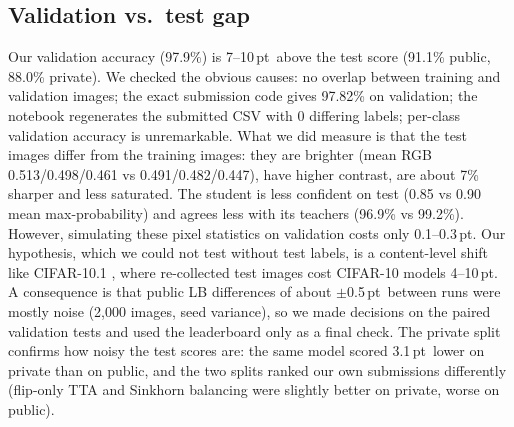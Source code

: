\documentclass[10pt]{article}
\newcommand{\pt}{\,pt}
\begin{document}
\subsection{Validation vs.\ test gap}\label{sec:gap}
Our validation accuracy (97.9\%) is 7--10\pt\ above the test score (91.1\% public, 88.0\% private). We checked the obvious causes:
no overlap between training and validation images; the exact submission code gives 97.82\% on validation;
the notebook regenerates the submitted CSV with 0 differing labels; per-class validation accuracy is unremarkable.
What we did measure is that the test images differ from the training images: they are brighter
(mean RGB 0.513/0.498/0.461 vs 0.491/0.482/0.447), have higher contrast, are about 7\% sharper and less saturated.
The student is less confident on test (0.85 vs 0.90 mean max-probability) and agrees less with its teachers (96.9\% vs 99.2\%).
However, simulating these pixel statistics on validation costs only 0.1--0.3\pt. Our hypothesis, which we could not test without
test labels, is a content-level shift like CIFAR-10.1 \cite{recht2018cifar}, where re-collected test images cost CIFAR-10 models
4--10\pt. A consequence is that public LB differences of about $\pm$0.5\pt\ between runs were mostly noise (2,000 images,
seed variance), so we made decisions on the paired validation tests and used the leaderboard only as a final check.
The private split confirms how noisy the test scores are: the same model scored 3.1\pt\ lower on private than on public,
and the two splits ranked our own submissions differently (flip-only TTA and Sinkhorn balancing were slightly better on
private, worse on public).
\end{document}
